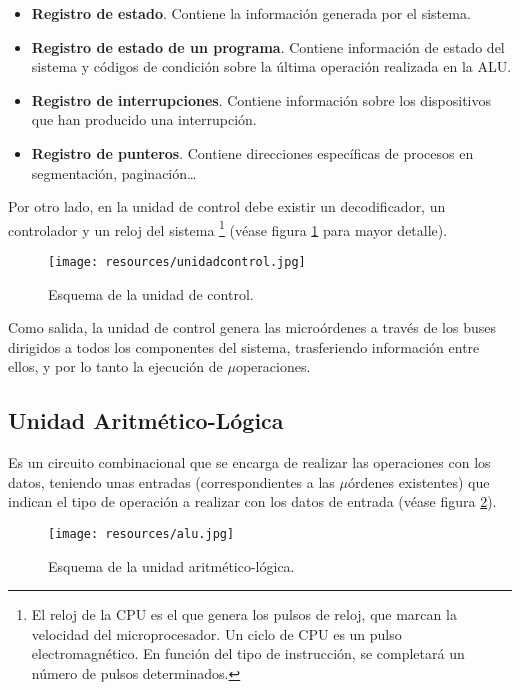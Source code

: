 \documentclass[a4paper, 11pt, titlepage]{article}
\begin{document}
        \begin{itemize}
            \item \textbf{Registro de estado}. Contiene la información generada por el sistema.
            \item \textbf{Registro de estado de un programa}. Contiene información de estado del sistema y códigos 
            de condición sobre la última operación realizada en la ALU.
            \item \textbf{Registro de interrupciones}. Contiene información sobre los dispositivos que han producido 
            una interrupción.
            \item \textbf{Registro de punteros}. Contiene direcciones específicas de procesos en segmentación, paginación\dots
        \end{itemize}

        Por otro lado, en la unidad de control debe existir un decodificador, un controlador y un reloj del 
        sistema \footnote{
            El reloj de la CPU es el que genera los pulsos de reloj, que marcan la velocidad del microprocesador. Un ciclo 
            de CPU es un pulso electromagnético. En función del tipo de instrucción, se completará un número de pulsos 
            determinados.
        } (véase figura \ref{unidadcontrol} para mayor detalle).

        \begin{figure}[htp]
            \centering
            \texttt{[image: resources/unidadcontrol.jpg]}
            \caption{Esquema de la unidad de control.}
            \label{unidadcontrol}
        \end{figure}

        Como salida, la unidad de control genera las microórdenes a través de los buses dirigidos a todos los 
        componentes del sistema, trasferiendo información entre ellos, y por lo tanto la ejecución de $\mu$operaciones.

    \subsection{Unidad Aritmético-Lógica}

        Es un circuito combinacional que se encarga de realizar las operaciones con los datos, teniendo unas 
        entradas (correspondientes a las $\mu$órdenes existentes) que indican el tipo de operación a realizar 
        con los datos de entrada (véase figura \ref{alu}).

        \begin{figure}[htp]
            \centering
            \texttt{[image: resources/alu.jpg]}
            \caption{Esquema de la unidad aritmético-lógica.}
            \label{alu}
        \end{figure}
\end{document}
